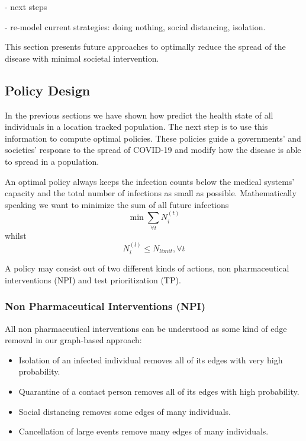 - next steps

- re-model current strategies: doing nothing, social distancing, isolation.

This section presents future approaches to optimally reduce the spread of the disease with minimal societal intervention.


\subsection{Policy Design}
In the previous sections we have shown how predict the health state of all individuals in a location tracked population.
The next step is to use this information to compute optimal policies.
These policies guide a governments' and societies' response to the spread of COVID-19 and modify how the disease is able to spread in a population.

An optimal policy always keeps the infection counts below the medical systems' capacity and the total number of infections as small as possible.
Mathematically speaking we want to minimize the sum of all future infections
\begin{equation}\label{eq:number-of-infected}
	\min \sum_{\forall t} N^{(t)}_i
\end{equation}
whilst
\begin{equation}\label{eq:cap-constraint}
	N^{(l)}_i \leq N_{limit}, \forall t
\end{equation}

A policy may consist out of two different kinds of actions, non pharmaceutical interventions (NPI) and test prioritization (TP).


\subsubsection{Non Pharmaceutical Interventions (NPI)}
All non pharmaceutical interventions can be understood as some kind of edge removal in our graph-based approach:
\begin{itemize}
	\item Isolation of an infected individual removes all of its edges with very high probability.
	\item Quarantine of a contact person removes all of its edges with high probability.
	\item Social distancing removes some edges of many individuals.
	\item Cancellation of large events remove many edges of many individuals.
\end{itemize}

